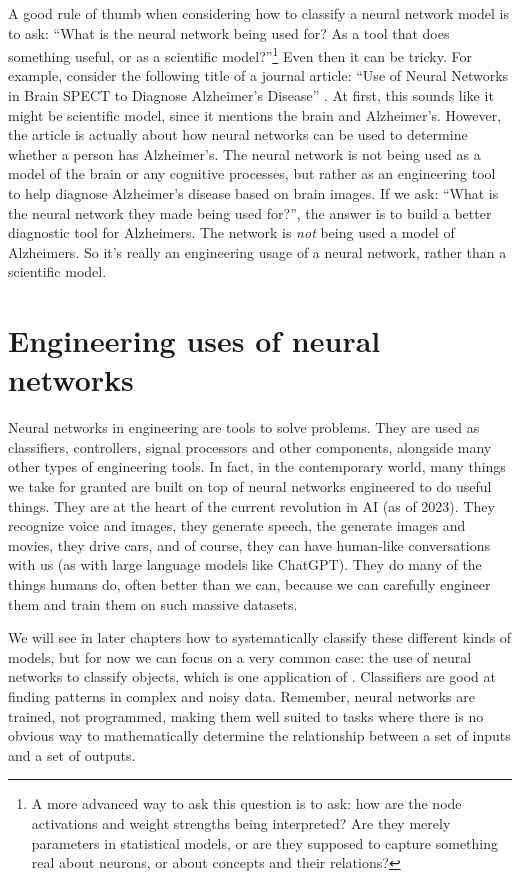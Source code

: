 A good rule of thumb when considering how to classify a neural network model is to ask: ``What is the neural network being used for? As a tool that does something useful, or as a scientific model?''\footnote{A more advanced way to ask this question is to ask: how are the node activations and weight strengths being interpreted? Are they merely parameters in statistical models, or are they supposed to capture something real about neurons, or about concepts and their relations?} Even then it can be tricky. For example, consider the following title of a journal article: ``Use of Neural Networks in Brain SPECT to Diagnose Alzheimer's Disease'' \cite{page1996use}. At first, this sounds like it might be scientific model, since it mentions the brain and Alzheimer's. However, the article is actually about how neural networks can be used to determine whether a person has Alzheimer's. The neural network is not being used as a model of the brain or any cognitive processes, but rather as an engineering tool to help diagnose Alzheimer's disease based on brain images. If we ask: ``What is the neural network they made being used for?'', the answer is to build a better diagnostic tool for Alzheimers. The network is \emph{not} being used a model of Alzheimers. So it's really an engineering usage of a neural network, rather than a scientific model.

\section{Engineering uses of neural networks}\label{machineLearning}


Neural networks in engineering are tools to solve problems. They are used as classifiers, controllers, signal processors and other components, alongside many other types of engineering tools. In fact, in the contemporary world, many things we take for granted are built on top of neural networks engineered to do useful things. They are at the heart of the current revolution in AI (as of 2023). They recognize voice and images, they generate speech, the generate images and movies, they drive cars, and of course, they can have human-like conversations with us (as with large language models like ChatGPT). They do many of the things humans do, often better than we can, because we can carefully engineer them and train them on such massive datasets.

We will see in later chapters how to systematically classify these different kinds of models, but for now we can focus on a very common case: the use of neural networks to classify objects, which is  one application of  . Classifiers are good at  finding patterns in complex and noisy data. Remember, neural networks are trained, not programmed, making them well suited to tasks where there is no obvious way to mathematically determine the relationship between a set of inputs and a set of outputs.

